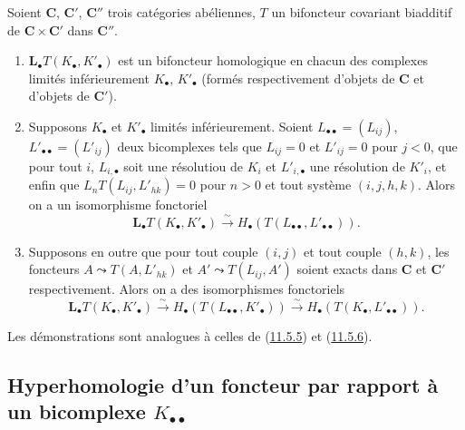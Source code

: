 \begin{proposition}[11.6.5]
\label{0.11.6.5-fr}
Soient $\boldsymbol{C}$, $\boldsymbol{C}'$, $\boldsymbol{C}''$ trois catégories
abéliennes, $T$ un bifoncteur covariant biadditif de
$\boldsymbol{C}\times\boldsymbol{C}'$ dans $\boldsymbol{C}''$.
\begin{enumerate}
\item[{\rm(i)}] {$\mathbf{L}_\bullet T(K_\bullet,K'_\bullet)$ est un bifoncteur
homologique en chacun des complexes limités inférieurement $K_\bullet$,
$K'_\bullet$ (formés respectivement d'objets de $\boldsymbol{C}$ et d'objets de
$\boldsymbol{C}'$).}
\item[{\rm(ii)}] {Supposons $K_\bullet$ et $K'_\bullet$ limités
inférieurement. Soient $L_{\bullet\bullet}=(L_{ij})$,
$L'_{\bullet\bullet}=(L'_{ij})$ deux bicomplexes tels que $L_{ij}=0$ et
$L'_{ij}=0$ pour $j<0$, que pour tout $i$, $L_{i,\bullet}$ soit une
résolutiou de $K_i$ et $L'_{i,\bullet}$ une résolution de $K'_i$, et enfin que
$L_nT(L_{ij},L'_{hk})=0$ pour $n>0$ et tout système $(i,j,h,k)$. Alors on a
un isomorphisme fonctoriel}
\[
\label{0.11.6.5.1-fr}
\tag{11.6.5.1}
\mathbf{L}_\bullet T(K_\bullet,K'_\bullet)
\xrightarrow{\sim} H_\bullet(T(L_{\bullet\bullet},L'_{\bullet\bullet})).
\]
\item[{\rm(iii)}] {Supposons en outre que pour tout couple $(i,j)$ et
tout couple $(h,k)$, les foncteurs
$A\leadsto T(A,L'_{hk})$ et $A'\leadsto T(L_{ij},A')$
soient exacts dans $\boldsymbol{C}$ et $\boldsymbol{C}'$ respectivement. Alors on a
des isomorphismes fonctoriels}
\[
\label{0.11.6.5.2-fr}
\tag{11.6.5.2}
\mathbf{L}_\bullet T(K_\bullet,K'_\bullet)
\xrightarrow{\sim} H_\bullet(T(L_{\bullet\bullet},K'_\bullet))
\xrightarrow{\sim} H_\bullet(T(K_\bullet,L'_{\bullet\bullet})).
\]
\end{enumerate}
\upshape Les démonstrations sont analogues à celles de
(\hyperref[0.11.5.5-fr]{11.5.5}) et (\hyperref[0.11.5.6-fr]{11.5.6}).
\end{proposition}

\subsection{Hyperhomologie d'un foncteur par rapport à un bicomplexe
$K_{\bullet\bullet}$}
\label{subsection:0.11.7-fr}

